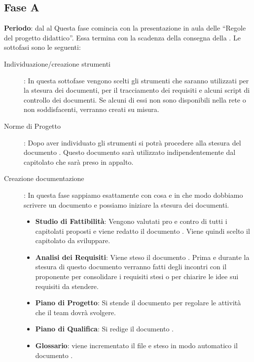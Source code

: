 \subsection{Fase A}
	\textbf{Periodo}: dal  al 
	Questa fase comincia con la presentazione in aula delle “Regole del progetto didattico”. Essa termina con la scadenza della consegna della .
	\newline Le sottofasi sono le seguenti:
	\begin{description}
		\item[Individuazione/creazione strumenti]: In questa sottofase vengono scelti gli strumenti che saranno utilizzati per la stesura dei documenti, per il tracciamento dei requisiti e alcuni script di controllo dei documenti. Se alcuni di essi non sono disponibili nella rete o non soddisfacenti, verranno creati su misura.
		\item[Norme di Progetto]: Dopo aver individuato gli strumenti si potrà procedere alla stesura del documento . Questo documento sarà utilizzato indipendentemente dal capitolato che sarà preso in appalto.
		\item[Creazione documentazione]: In questa fase sappiamo esattamente con cosa e in che modo dobbiamo scrivere un documento e possiamo iniziare la stesura dei documenti.
			\begin{itemize}
				\item \textbf{Studio di Fattibilità}: Vengono valutati pro e contro di tutti i capitolati proposti e viene redatto il documento . 
				Viene quindi scelto il capitolato da sviluppare.
				\item \textbf{Analisi dei Requisiti}: Viene steso il documento . 
				Prima e durante la stesura di questo documento verranno fatti degli incontri con il proponente per consolidare i requisiti stesi o per chiarire le idee sui requisiti da stendere.
				\item \textbf{Piano di Progetto}: Si stende il documento  per regolare le attività che il team dovrà svolgere.
				\item \textbf{Piano di Qualifica}: Si redige il documento .
				\item \textbf{Glossario}: viene incrementato il file   e steso in modo automatico il documento .
			\end{itemize}
	\end{description}
